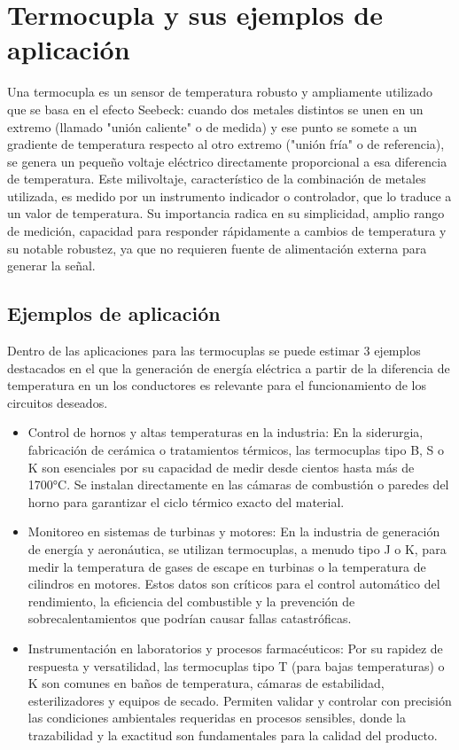 \section*{Termocupla y sus ejemplos de aplicación}

Una termocupla es un sensor de temperatura robusto y ampliamente utilizado que se basa en el efecto Seebeck: cuando dos metales distintos se unen en un extremo (llamado "unión caliente" o de medida) y ese punto se somete a un gradiente de temperatura respecto al otro extremo ("unión fría" o de referencia), se genera un pequeño voltaje eléctrico directamente proporcional a esa diferencia de temperatura. Este milivoltaje, característico de la combinación de metales utilizada, es medido por un instrumento indicador o controlador, que lo traduce a un valor de temperatura. Su importancia radica en su simplicidad, amplio rango de medición, capacidad para responder rápidamente a cambios de temperatura y su notable robustez, ya que no requieren fuente de alimentación externa para generar la señal.

\subsection*{Ejemplos de aplicación}

Dentro de las aplicaciones para las termocuplas se puede estimar 3 ejemplos destacados en el que la generación de energía eléctrica a partir de la diferencia de temperatura en un los conductores es relevante para el funcionamiento de los circuitos deseados.

 \begin{itemize}
 	\item Control de hornos y altas temperaturas en la industria: En la siderurgia, fabricación de cerámica o tratamientos térmicos, las termocuplas tipo B, S o K son esenciales por su capacidad de medir desde cientos hasta más de 1700°C. Se instalan directamente en las cámaras de combustión o paredes del horno para garantizar el ciclo térmico exacto del material.
 	\item Monitoreo en sistemas de turbinas y motores: En la industria de generación de energía y aeronáutica, se utilizan termocuplas, a menudo tipo J o K, para medir la temperatura de gases de escape en turbinas o la temperatura de cilindros en motores. Estos datos son críticos para el control automático del rendimiento, la eficiencia del combustible y la prevención de sobrecalentamientos que podrían causar fallas catastróficas.
 	\item Instrumentación en laboratorios y procesos farmacéuticos: Por su rapidez de respuesta y versatilidad, las termocuplas tipo T (para bajas temperaturas) o K son comunes en baños de temperatura, cámaras de estabilidad, esterilizadores y equipos de secado. Permiten validar y controlar con precisión las condiciones ambientales requeridas en procesos sensibles, donde la trazabilidad y la exactitud son fundamentales para la calidad del producto.
 \end{itemize}
 
